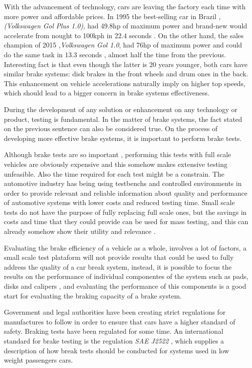 	With the advancement of technology, cars are leaving the factory each time with more power and affordable prices. In 1995 the best-selling car in Brazil \cite{lideres-vendas-brasil}, \textit{(Volkswagen Gol Plus 1.0)}, had 49.8hp of maximum power and brand-new would accelerate from nought to 100kph in 22.4 seconds \cite{cnwgol1993}. On the other hand, the sales champion of 2015 ,\textit{Volkswagen Gol 1.0}, had 76hp of maximum power and could do the same task in 13.3 seconds \cite{cnwgol2013}, almost half the time from the previous. Interesting fact is that even though the latter is 20 years younger, both cars have similar brake systems: disk brakes in the front wheels and drum ones in the back. This enhancement on vehicle accelerations naturally imply on higher top speeds, which should lead to a bigger concern in brake systems effectiveness.
	\par
	During the development of any solution or enhancement on any technology or product, testing is fundamental. In the matter of brake systems, the fact stated on the previous sentence can also be considered true. On the process of developing more effective brake systems, it is important to perform brake tests.
	\par
	Although brake tests are so important \cite{abendroth1985new}, performing this tests with full scale vehicles are obviously expensive and this somehow makes extensive testing unfeasible. Also the time required for each test might be a constrain. The automotive industry has being using testbenchs and controlled environments in order to provide relevant and reliable information about quality and performance of automotive systems with lower costs and reduced testing time. Small scale tests do not have the purpose of fully replacing full scale ones, but the savings in costs and time that they could provide can be used for mass testing, and this can already somehow show their utility and relevance \cite{gardinalli2005comparaccao}. 
	\par
	Evaluating the brake efficiency of a vehicle as a whole, involves a lot of factors, a small scale test plataform will not provide results that could be used to fully address the quality of a car break system, instead, it is possible to focus the results on the performance of individual componentes of the system such as pads, disks and calipers \cite{halderman2016automotive}, and evaluating the performance of this components is a good start for evaluating the braking capacity of a brake system.
	\par
	Government and legal authorities have been creating strict regulations for manufactures to follow in order to ensure that cars have a higher standard of safety. Braking tests have been regulated for some time. An international standard for brake testing is the regulation \textit{SAE J2522} \cite{sae}, which supplies a description of how break tests should be conducted for systems used in low weight passengers cars.
